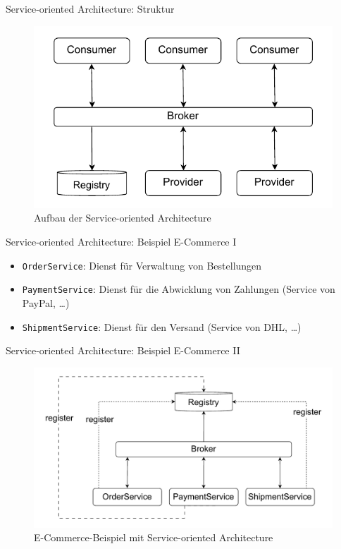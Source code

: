 \begin{frame}{Service-oriented Architecture: Struktur}
    \begin{figure}[!h]
        \centering
        \includegraphics[scale=0.80]{imglib/soa/soa}
        \caption{Aufbau der Service-oriented Architecture}
        \label{fig:soa}
    \end{figure}
\end{frame}

\begin{frame}{Service-oriented Architecture: Beispiel E-Commerce I}
    \begin{itemize}
        \item \texttt{OrderService}: Dienst für Verwaltung von Bestellungen
        \item \texttt{PaymentService}: Dienst für die Abwicklung von Zahlungen (Service von PayPal, \ldots)
        \item \texttt{ShipmentService}: Dienst für den Versand (Service von DHL, \ldots)
    \end{itemize}
\end{frame}

\begin{frame}{Service-oriented Architecture: Beispiel E-Commerce II}
    \begin{figure}[!h]
        \centering
        \includegraphics[scale=0.50]{imglib/soa/soa-example}
        \caption{E-Commerce-Beispiel mit Service-oriented Architecture}
        \label{fig:soaecommerce}
    \end{figure}
\end{frame}

